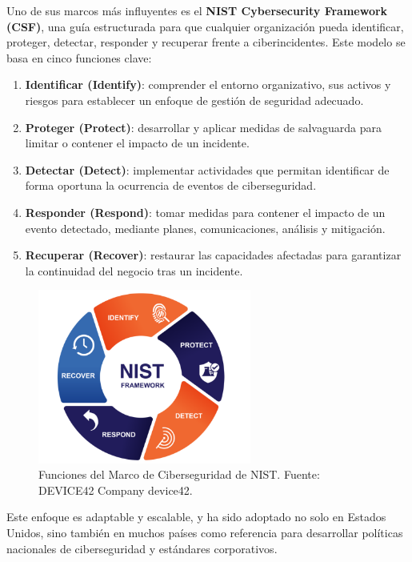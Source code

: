 \documentclass[a4paper, 10pt]{article}
\begin{document}
Uno de sus marcos más influyentes es el \textbf{NIST Cybersecurity Framework (CSF)}, una guía estructurada para que cualquier organización pueda identificar, proteger, detectar, responder y recuperar frente a ciberincidentes. Este modelo se basa en cinco funciones clave:
\begin{enumerate}
\item \textbf{Identificar (Identify)}: comprender el entorno organizativo, sus activos y riesgos para establecer un enfoque de gestión de seguridad adecuado.
\item \textbf{Proteger (Protect)}: desarrollar y aplicar medidas de salvaguarda para limitar o contener el impacto de un incidente.
\item \textbf{Detectar (Detect)}: implementar actividades que permitan identificar de forma oportuna la ocurrencia de eventos de ciberseguridad.
\item \textbf{Responder (Respond)}: tomar medidas para contener el impacto de un evento detectado, mediante planes, comunicaciones, análisis y mitigación.
\item \textbf{Recuperar (Recover)}: restaurar las capacidades afectadas para garantizar la continuidad del negocio tras un incidente.
\end{enumerate}

\begin{figure}[H]
\centering
\includegraphics[width=7cm]{images/nist_framework.png}
\caption{Funciones del Marco de Ciberseguridad de NIST. Fuente: DEVICE42 Company {device42}.}
\label{fig:nist-framework}
\end{figure}

Este enfoque es adaptable y escalable, y ha sido adoptado no solo en Estados Unidos, sino también en muchos países como referencia para desarrollar políticas nacionales de ciberseguridad y estándares corporativos.

\par\vspace{0.5cm}
\end{document}
